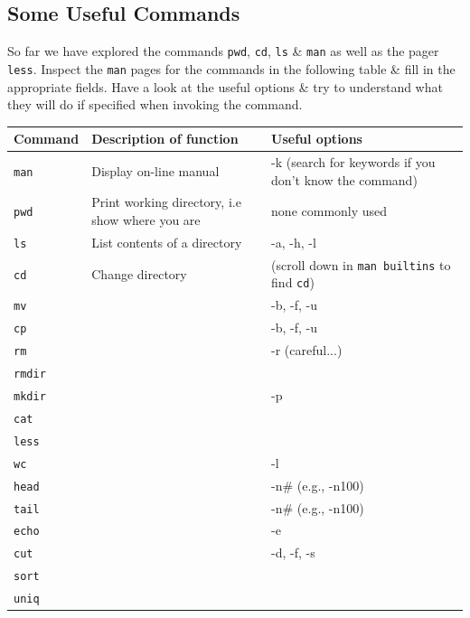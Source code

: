\documentclass[a4paper,12pt,twoside]{memoir}
\begin{document}
\subsection{Some Useful Commands}
\begin{steps}
So far we have explored the commands \texttt{pwd}, \texttt{cd}, \texttt{ls} \& \texttt{man} as well as the pager \texttt{less}.
Inspect the \texttt{man} pages for the commands in the following table  \& fill in the appropriate fields.
Have a look at the useful options \& try to understand what they will do if specified when invoking the command. \\

\begin{center}
\renewcommand{\arraystretch}{1.6}
\begin{tabular}{|p{2cm} | p{8.5cm} | p{4.5cm}|}
\hline
\textbf{Command} & \textbf{Description of function} & \textbf{Useful options} \\ \hline
\texttt{man} & Display on-line manual & -k (search for keywords if you don't know the command) \\ \hline
\texttt{pwd} & Print working directory, i.e show where you are & none commonly used \\ \hline
\texttt{ls} & List contents of a directory & -a, -h, -l \\ \hline
\texttt{cd} & Change directory & (scroll down in \texttt{man builtins} to find \texttt{cd}) \\ \hline
\texttt{mv} & & -b, -f, -u \\ \hline
\texttt{cp} & & -b, -f, -u \\ \hline
\texttt{rm} & & -r (careful...) \\ \hline
\texttt{rmdir} & & \\ \hline
\texttt{mkdir} & & -p\\ \hline
\texttt{cat} & & \\ \hline
\texttt{less} & & \\ \hline
\texttt{wc} & & -l \\ \hline
\texttt{head} & & -n\# (e.g., -n100) \\ \hline
\texttt{tail} & & -n\# (e.g., -n100) \\ \hline
\texttt{echo} & &  -e\\ \hline
\texttt{cut} & & -d, -f, -s \\ \hline
\texttt{sort} & & \\ \hline
\texttt{uniq} & & \\ \hline
\end{tabular}
\end{center}
\end{steps}
\end{document}
